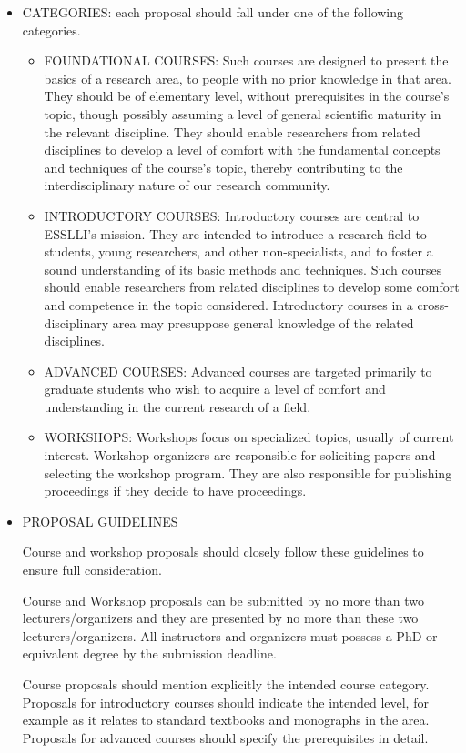 \documentclass[prodmode,acmtecs]{acmsmall} %
\begin{document}
\begin{itemize}
\item  CATEGORIES: each proposal should fall under one of the following categories. 
 
\begin{itemize}\item  FOUNDATIONAL COURSES: Such courses are designed to present the basics of a research area, to people with no prior knowledge in that area. They should be of elementary level, without prerequisites in the course's topic, though possibly assuming a level of general scientific maturity in the relevant discipline. They should enable researchers from related disciplines to develop a level of comfort with the fundamental concepts and techniques of the course's topic, thereby contributing to the interdisciplinary nature of our research community.
\item  INTRODUCTORY COURSES: Introductory courses are central to ESSLLI's mission. They are intended to introduce a research field to students, young researchers, and other non-specialists, and to foster a sound understanding of its basic methods and techniques. Such courses should enable researchers from related disciplines to develop some comfort and competence in the topic considered. Introductory courses in a cross-disciplinary area may presuppose general knowledge of the related disciplines.
\item  ADVANCED COURSES: Advanced courses are targeted primarily to graduate students who wish to acquire a level of comfort and understanding in the current research of a field.
\item  WORKSHOPS: Workshops focus on specialized topics, usually of current interest. Workshop organizers are responsible for soliciting papers and selecting the workshop program. They are also responsible for publishing proceedings if they decide to have proceedings. 
\end{itemize} 
\item  PROPOSAL GUIDELINES 
 
  Course and workshop proposals should closely follow these guidelines to  ensure full consideration. 
 
   Course and Workshop proposals can be submitted by no more than two lecturers/organizers and they are presented by no more than these two lecturers/organizers. All instructors and organizers must possess a PhD or equivalent degree by the submission deadline. 
 
  Course proposals should mention explicitly the intended course category. Proposals for introductory courses should indicate the intended level, for example as it relates to standard textbooks and monographs in the area. Proposals for advanced courses should specify the prerequisites in detail.  
 

\end{itemize}
\end{document}
